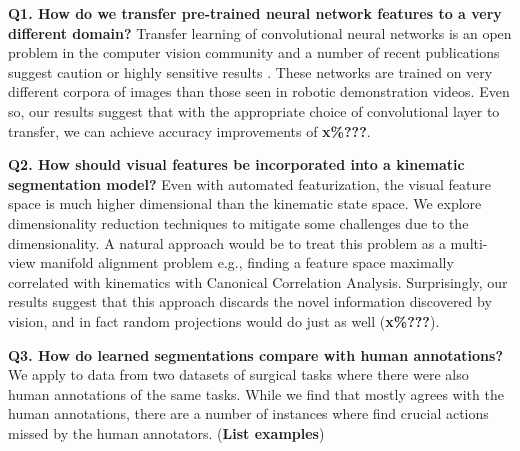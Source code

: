 \vspace{0.25em}

\textbf{Q1. How do we transfer pre-trained neural network features to a very different domain? } Transfer learning of convolutional neural networks is an open problem in the computer vision community and a number of recent publications suggest caution or highly sensitive results \cite{oquab2014learning}.  These networks are trained on very different corpora of images than those seen in robotic demonstration videos. Even so, our results suggest that with the appropriate choice of convolutional layer to transfer, we can achieve accuracy improvements of \textbf{x\%???}.

\vspace{0.25em}

\textbf{Q2. How should visual features be incorporated into a kinematic segmentation model? } Even with automated featurization, the visual feature space is much higher dimensional than the kinematic state space. We explore dimensionality reduction techniques to mitigate some challenges due to the dimensionality. A natural approach would be to treat this problem as a multi-view manifold alignment problem e.g., finding a feature space maximally correlated with kinematics with Canonical Correlation Analysis. Surprisingly, our results suggest that this approach discards the novel information discovered by vision, and in fact random projections would do just as well (\textbf{x\%???}).

\vspace{0.25em}

\textbf{Q3. How do learned segmentations compare with human annotations? } We apply \sys to data from two datasets of surgical tasks \cite{gao2014jigsaws} where there were also human annotations of the same tasks.
While we find that \sys mostly agrees with the human annotations, there are a number of instances where \sys find crucial actions missed by the human annotators. (\textbf{List examples}) 

